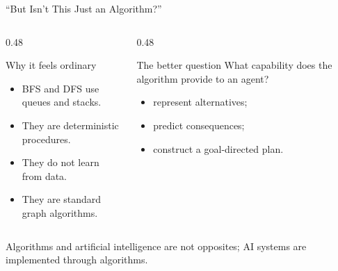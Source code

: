 \documentclass[aspectratio=169,10pt]{beamer}
\begin{document}

\begin{frame}[shrink=20]{``But Isn't This Just an Algorithm?''}
  \begin{columns}[T,onlytextwidth]
    \begin{column}{0.48\textwidth}
      \begin{block}{Why it feels ordinary}
        \begin{itemize}
          \item BFS and DFS use queues and stacks.
          \item They are deterministic procedures.
          \item They do not learn from data.
          \item They are standard graph algorithms.
        \end{itemize}
      \end{block}
    \end{column}

    \begin{column}{0.48\textwidth}
      \begin{block}{The better question}
        What capability does the algorithm provide to an agent?
        \begin{itemize}
          \item represent alternatives;
          \item predict consequences;
          \item construct a goal-directed plan.
        \end{itemize}
      \end{block}
    \end{column}
  \end{columns}

  \begin{keyidea}
    Algorithms and artificial intelligence are not opposites; AI systems are implemented through algorithms.
  \end{keyidea}
\end{frame}
\end{document}
